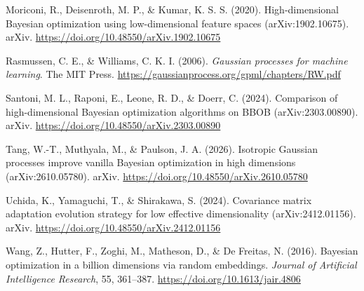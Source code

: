 \documentclass[11pt]{article}
\begin{document}
\begin{small}
Moriconi, R., Deisenroth, M. P., \& Kumar, K. S. S. (2020). High-dimensional Bayesian optimization using low-dimensional feature spaces (arXiv:1902.10675). arXiv. \url{https://doi.org/10.48550/arXiv.1902.10675}

Rasmussen, C. E., \& Williams, C. K. I. (2006). \emph{Gaussian processes for machine learning}. The MIT Press. \url{https://gaussianprocess.org/gpml/chapters/RW.pdf}

Santoni, M. L., Raponi, E., Leone, R. D., \& Doerr, C. (2024). Comparison of high-dimensional Bayesian optimization algorithms on BBOB (arXiv:2303.00890). arXiv. \url{https://doi.org/10.48550/arXiv.2303.00890}

Tang, W.-T., Muthyala, M., \& Paulson, J. A. (2026). Isotropic Gaussian processes improve vanilla Bayesian optimization in high dimensions (arXiv:2610.05780). arXiv. \url{https://doi.org/10.48550/arXiv.2610.05780}

Uchida, K., Yamaguchi, T., \& Shirakawa, S. (2024). Covariance matrix adaptation evolution strategy for low effective dimensionality (arXiv:2412.01156). arXiv. \url{https://doi.org/10.48550/arXiv.2412.01156}

Wang, Z., Hutter, F., Zoghi, M., Matheson, D., \& De Freitas, N. (2016). Bayesian optimization in a billion dimensions via random embeddings. \emph{Journal of Artificial Intelligence Research}, 55, 361--387. \url{https://doi.org/10.1613/jair.4806}

\end{small}
\end{document}
